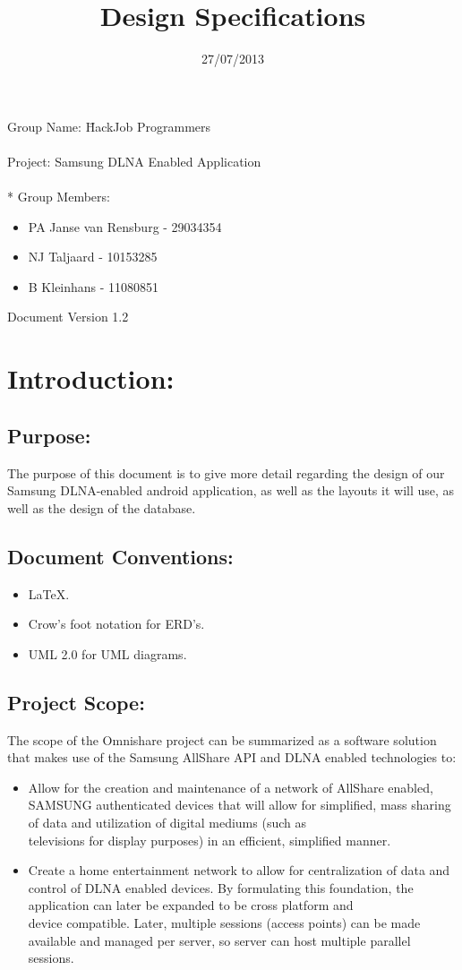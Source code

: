 \documentclass[12pt]{article}
\title{Design Specifications}
\date{27/07/2013}
\begin{document}
  \maketitle
\begin{tabbing}
Group Name: \= HackJob Programmers
\\~
\\Project: Samsung DLNA Enabled Application
\\~
  \\* Group Members:
\end{tabbing}
	
	\begin{itemize}
	\item PA Janse van Rensburg - 29034354
	\item NJ Taljaard - 10153285
	\item B Kleinhans - 11080851
	\end{itemize}

Document Version 1.2

\newpage
\section{Introduction:}
\subsection{Purpose:}
The purpose of this document is to give more detail regarding the design of our Samsung DLNA-enabled android application, as well as the layouts it will use, as well as the design of the database.
\subsection{Document Conventions:}
\begin{itemize}
\item LaTeX.
\item Crow's foot notation for ERD's.
\item UML 2.0 for UML diagrams.
\end{itemize}
\subsection{Project Scope:}
The scope of the Omnishare project can be summarized as a software solution that makes use of the Samsung AllShare API and DLNA enabled technologies to:
\begin{itemize}
\item Allow for the creation and maintenance of a network of AllShare enabled, SAMSUNG authenticated devices  that will allow for simplified, mass sharing of data and utilization of digital mediums (such as
\\ televisions for display purposes) in an efficient, simplified manner.
\item  Create a home entertainment network to allow for centralization of data and control of DLNA enabled devices.
By formulating this foundation, the application can later be expanded to be cross platform and 
\\device compatible.  Later, multiple sessions (access points) can be made available and managed per server, so server can host multiple parallel sessions.
\end{itemize}
\newpage
\end{document}
